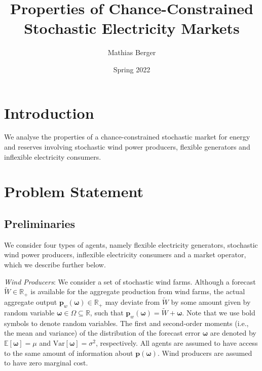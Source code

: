 \documentclass{article}
\title{Properties of Chance-Constrained Stochastic Electricity Markets}
\author{Mathias Berger}
\date{Spring 2022}
\begin{document}
\maketitle

\section{Introduction}

We analyse the properties of a chance-constrained stochastic market for energy and reserves involving stochastic wind power producers, flexible generators and inflexible electricity consumers. 

\section{Problem Statement}

\subsection{Preliminaries}

We consider four types of agents, namely flexible electricity generators, stochastic wind power producers, inflexible electricity consumers and a market operator, which we describe further below.

\textit{Wind Producers}: We consider a set of stochastic wind farms. Although a forecast $\tilde{W} \in \mathbb{R}_+$ is available for the aggregate production from wind farms, the actual aggregate output $\mathbf{p}_w(\boldsymbol{\omega}) \in \mathbb{R}_+$ may deviate from $\tilde{W}$ by some amount given by random variable $\boldsymbol{\omega} \in \Omega \subseteq \mathbb{R}$, such that $\mathbf{p}_w(\boldsymbol{\omega}) = \tilde{W} + \boldsymbol{\omega}$. Note that we use bold symbols to denote random variables. The first and second-order moments (i.e., the mean and variance) of the distribution of the forecast error $\boldsymbol{\omega}$ are denoted by $\mathbb{E}[\boldsymbol{\omega}] = \mu$ and $\mbox{Var}[\boldsymbol{\omega}] = \sigma^2$, respectively. All agents are assumed to have access to the same amount of information about $\mathbf{p}(\boldsymbol{\omega})$. Wind producers are assumed to have zero marginal cost.
\end{document}
